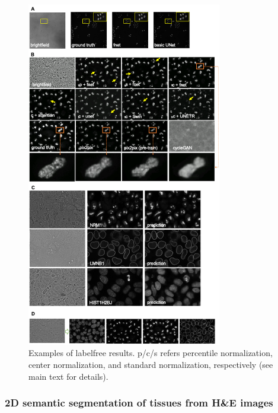 \begin{figure}
\hypertarget{fig:labelfree}{%
\centering
\includegraphics[width=0.76\textwidth,height=0.9\textheight]{images/labelfree.png}
\caption{Examples of labelfree results. p/c/s refers percentile normalization, center normalization, and standard normalization, respectively (see main text for details).}\label{fig:labelfree}
}
\end{figure}

\hypertarget{d-semantic-segmentation-of-tissues-from-he-images}{%
\subsubsection{2D semantic segmentation of tissues from H\&E images}\label{d-semantic-segmentation-of-tissues-from-he-images}}

